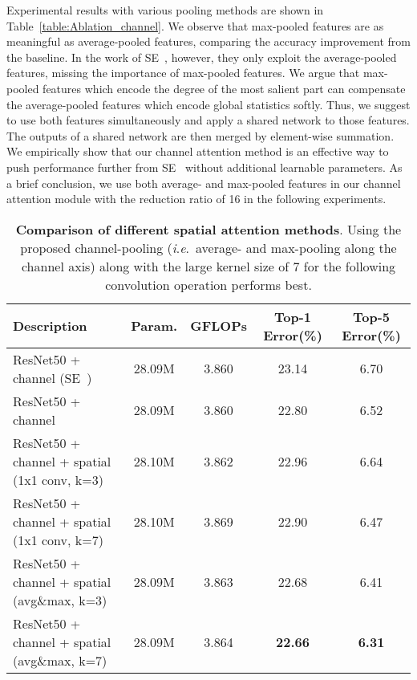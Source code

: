 \documentclass[runningheads]{llncs}
\newcommand{\ie}{\textit{i}.\textit{e}.}
\newcommand{\tabref}[1]{Table~\ref{#1}}
\begin{document}
Experimental results with various pooling methods are shown in \tabref{table:Ablation_channel}. We observe that max-pooled features are as meaningful as average-pooled features, comparing the accuracy improvement from the baseline. In the work of SE~\cite{hu2017squeeze}, however, they only exploit the average-pooled features, missing the importance of max-pooled features. We argue that max-pooled features which encode the degree of the most salient part can compensate the average-pooled features which encode global statistics softly. Thus, we suggest to use both features simultaneously and apply a shared network to those features. The outputs of a shared network are then merged by element-wise summation.  We empirically show that our channel attention method is an effective way to push performance further from SE~\cite{hu2017squeeze} without additional learnable parameters. As a brief conclusion, we use both average- and max-pooled features in our channel attention module with the reduction ratio of 16 in the following experiments.


\begin{table}[t]
\begin{center}
\begin{adjustbox}{max width=\textwidth}
\begin{tabular}{ l|c|c|c|c }
\hline
Description &  Param. &  GFLOPs &  Top-1 Error(\%) &  Top-5 Error(\%) \\
\hline
\hline
ResNet50 + channel (SE~\cite{hu2017squeeze})                            & 28.09M    & 3.860
                                                    & 23.14 &   6.70\\
\hline
ResNet50 + channel                            & 28.09M    & 3.860
                                                    & 22.80  &   6.52\\
ResNet50 + channel + spatial (1x1 conv, k=3)  & 28.10M & 3.862
                                                    & 22.96  &   6.64\\
ResNet50 + channel + spatial (1x1 conv, k=7)  & 28.10M & 3.869
                                                    & 22.90  &   6.47\\
ResNet50 + channel + spatial (avg\&max, k=3)  & 28.09M & 3.863
                                                    & 22.68  &   6.41\\
ResNet50 + channel + spatial (avg\&max, k=7)  & 28.09M & 3.864
                                                    & \textbf{22.66}  &   \textbf{6.31}\\
\hline
\end{tabular}
\end{adjustbox}
\end{center}
\caption{\textbf{Comparison of different spatial attention methods}. Using the proposed channel-pooling (\ie\ average- and max-pooling along the channel axis) along with the large kernel size of 7 for the following convolution operation performs best.}
\label{table:Ablation_spatial}
\end{table}
\end{document}
